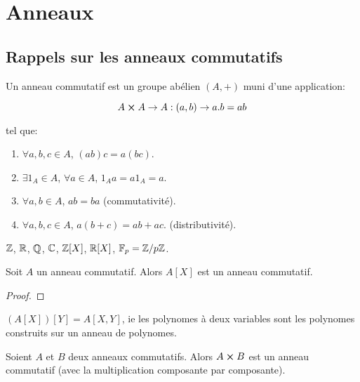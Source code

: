 \chapter{Anneaux}

\section{Rappels sur les anneaux commutatifs}

\begin{definition}
	Un anneau commutatif est un groupe abélien $(A, +)$ muni d'une application:

	\begin{equation*}
		A \cross A \rightarrow A : (a, b) \rightarrow a.b = ab
	\end{equation*}

	tel que:

	\begin{enumerate}
		\item $\forall a, b, c \in A$, $(ab)c = a(bc)$.
		\item $\exists 1_{A} \in A$, $\forall a \in A$, $1_{A} a = a 1_{A} = a$.
		\item $\forall a, b \in A$, $ab = ba$ (commutativité).
		\item $\forall a, b, c \in A$, $a(b + c) = ab + ac$. (distributivité).
	\end{enumerate}
\end{definition}

\begin{exemple}
	$\mathbb{Z}$, $\mathbb{R}$, $\mathbb{Q}$, $\mathbb{C}$, $\mathbb{Z}[X]$, $\mathbb{R}[X]$,
	$\mathbb{F}_{p} = \mathbb{Z}/p\mathbb{Z}$.
\end{exemple}

\begin{proposition}
	Soit $A$ un anneau commutatif. Alors $A[X]$ est un anneau commutatif.
\end{proposition}

\ifdefined\outputproof
\begin{proof}

\end{proof}
\fi

\begin{remarque}
	$(A[X])[Y] = A[X, Y]$, ie les polynomes à deux variables sont les polynomes
	construits sur un anneau de polynomes.
\end{remarque}

\begin{proposition}
	Soient $A$ et $B$ deux anneaux commutatifs. Alors $A \cross B$ est un
	anneau commutatif (avec la multiplication composante par composante).
\end{proposition}

